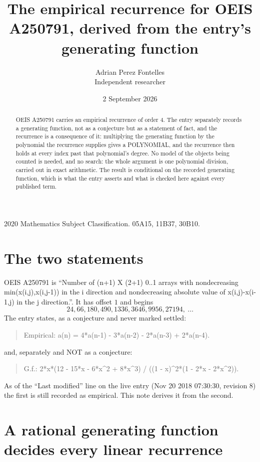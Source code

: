 \documentclass[11pt,a4paper]{article}
\title{The empirical recurrence for OEIS A250791, derived from the entry's generating function}
\author{Adrian Perez Fontelles\\ \small Independent researcher}
\date{2 September 2026}
\theoremstyle{plain}
\theoremstyle{definition}
\begin{document}
\maketitle

\begin{abstract}
OEIS A250791 carries an empirical recurrence of order $4$. The entry separately records a
generating function, not as a conjecture but as a statement of fact, and the recurrence is a
consequence of it: multiplying the generating function by the polynomial the recurrence
supplies gives a POLYNOMIAL, and the recurrence then holds at every index past that
polynomial's degree. No model of the objects being counted is needed, and no search: the
whole argument is one polynomial division, carried out in exact arithmetic. The result is
conditional on the recorded generating function, which is what the entry asserts and what is
checked here against every published term.
\end{abstract}

\noindent\small 2020 Mathematics Subject Classification. 05A15, 11B37, 30B10.\normalsize

\section{The two statements}

OEIS A250791 is ``Number of (n+1) X (2+1) 0..1 arrays with nondecreasing min(x(i,j),x(i,j-1)) in the i direction and nondecreasing absolute value of x(i,j)-x(i-1,j) in the j direction.''. It has offset $1$ and begins
\[
24, 66, 180, 490, 1336, 3646, 9956, 27194,\ \dots
\]
The entry states, as a conjecture and never marked settled:
\begin{quote}
Empirical: a(n) = 4*a(n-1) - 3*a(n-2) - 2*a(n-3) + 2*a(n-4).
\end{quote}
and, separately and NOT as a conjecture:
\begin{quote}
G.f.: 2*x*(12 - 15*x - 6*x\^{}2 + 8*x\^{}3) / ((1 - x)\^{}2*(1 - 2*x - 2*x\^{}2)).
\end{quote}
As of the ``Last modified'' line on the live entry (Nov 20 2018 07:30:30, revision 8) the first is still
recorded as empirical. This note derives it from the second.

\section{A rational generating function decides every linear recurrence}
\end{document}

